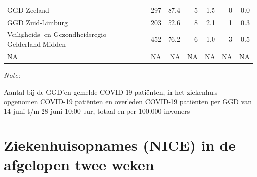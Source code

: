 \documentclass[
  english,
  man,floatsintext]{apa6}
\begin{document}
\begin{table}
\begin{threeparttable}
\begin{tabular}{lrrrrrr}
GGD Zeeland & 297 & 87.4 & 5 & 1.5 & 0 & 0.0\\
GGD Zuid-Limburg & 203 & 52.6 & 8 & 2.1 & 1 & 0.3\\
Veiligheids- en Gezondheidsregio Gelderland-Midden & 452 & 76.2 & 6 & 1.0 & 3 & 0.5\\
NA & NA & NA & NA & NA & NA & NA\\
\bottomrule
\end{tabular}
\begin{tablenotes}
\item \textit{Note: } 
\item Aantal bij de GGD’en gemelde COVID-19 patiënten, in het ziekenhuis opgenomen COVID-19 patiënten en overleden COVID-19 patiënten per GGD van 14 juni t/m 28 juni 10:00 uur, totaal en per 100.000 inwoners
\end{tablenotes}
\end{threeparttable}
\endgroup{}
\end{table}

\newpage

\hypertarget{ziekenhuisopnames-nice-in-de-afgelopen-twee-weken}{%
\section{Ziekenhuisopnames (NICE) in de afgelopen twee weken}\label{ziekenhuisopnames-nice-in-de-afgelopen-twee-weken}}
\end{document}

